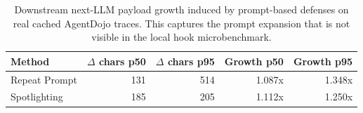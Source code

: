 \begin{table}[t]
\centering
\caption{Downstream next-LLM payload growth induced by prompt-based defenses on real cached AgentDojo traces. This captures the prompt expansion that is not visible in the local hook microbenchmark.}
\label{tab:system-hook-payload}
\small
\begin{tabular}{lrrrr}
\toprule
\textbf{Method} & \textbf{$\Delta$ chars p50} & \textbf{$\Delta$ chars p95} & \textbf{Growth p50} & \textbf{Growth p95} \\
\midrule
Repeat Prompt & 131 & 514 & 1.087x & 1.348x \\
Spotlighting & 185 & 205 & 1.112x & 1.250x \\
\bottomrule
\end{tabular}
\end{table}